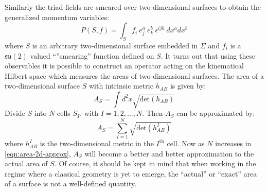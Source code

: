 \documentclass[submission, Phys]{SciPost}
\newcommand{\mf}[1]{\mathfrak{#1}}
\begin{document}
Similarly the triad fields are smeared over two-dimensional surfaces to obtain the generalized momentum variables:
\begin{equation}\label{eqn:triad}
P(S, f) = \int_S f_i~e^a_j~e^b_k~\epsilon^{ijk}~dx^a dx^b
\end{equation}
where $ S $ is an arbitrary two-dimensional surface embedded in $ \Sigma $ and $ f_i $ is a $ \mf{su}(2) $ valued ``''smearing'' function defined on $ S $. It turns out that using these observables it is possible to construct an operator acting on the kinematical Hilbert space which measures the areas of two-dimensional surfaces. The area of a two-dimensional surface $ S $ with intrinsic metric $ h_{AB} $ is given by:
\begin{equation}\label{eqn:area-2d}
	A_S = \int d^2 x \sqrt{\text{det}(h_{AB})}
\end{equation}
Divide $ S $ into $ N $ cells $ S_I $, with $ I = 1,2,\ldots,N $. Then $ A_S $ can be approximated by:
\begin{equation}\label{eqn:area-2d-approx}
	A_S = \sum_{I=1}^N \sqrt{\text{det}(h^I_{AB})}
\end{equation}
where $ h^I_{AB} $ is the two-dimensional metric in the $ I^\text{th} $ cell. Now as $ N $ increases in \eqref{eqn:area-2d-approx}, $ A_S $ will become a better and better approximation to the actual area of $ S $. Of course, it should be kept in mind that when working in the regime where a classical geometry is yet to emerge, the ``actual'' or ``exact'' area of a surface is not a well-defined quantity.
\end{document}
